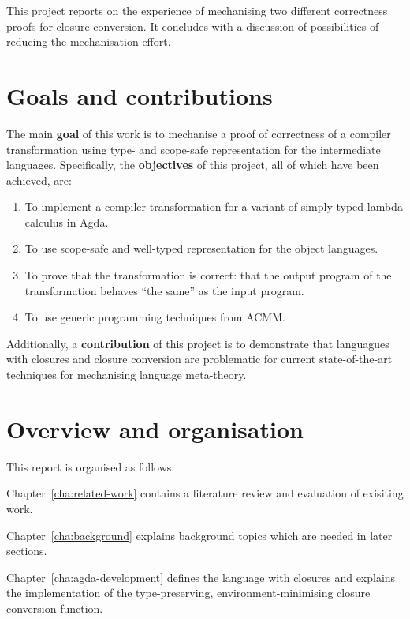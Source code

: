 \documentclass[bsc,frontabs,oneside,singlespacing,parskip,deptreport]{infthesis}
\theoremstyle{definition}
\theoremstyle{lemma}
\begin{document}
This project reports on the experience of mechanising two different
correctness proofs for closure conversion. It concludes with a
discussion of possibilities of reducing the mechanisation effort.

\section{Goals and contributions}
\label{sec:goals-contributions}

The main \textbf{goal} of this work is to mechanise a proof of
correctness of a compiler transformation using type- and scope-safe
representation for the intermediate languages. Specifically, the
\textbf{objectives} of this project, all of which have been achieved,
are:

\begin{enumerate}
\item To implement a compiler transformation for a variant of
  simply-typed lambda calculus in Agda.
\item To use scope-safe and well-typed representation for the object
  languages.
\item To prove that the transformation is correct: that the output
  program of the transformation behaves ``the same'' as the input
  program.
\item To use generic programming techniques from ACMM.
\end{enumerate}

Additionally, a \textbf{contribution} of this project is to
demonstrate that languagues with closures and closure conversion are
problematic for current state-of-the-art techniques for mechanising
language meta-theory.

\section{Overview and organisation}
\label{sec:overv-organ}

This report is organised as follows:

Chapter~\ref{cha:related-work} contains a literature review and
evaluation of exisiting work.

Chapter~\ref{cha:background} explains background topics which are
needed in later sections.

Chapter~\ref{cha:agda-development} defines the language with closures
and explains the implementation of the type-preserving,
environment-minimising closure conversion function.
\end{document}
